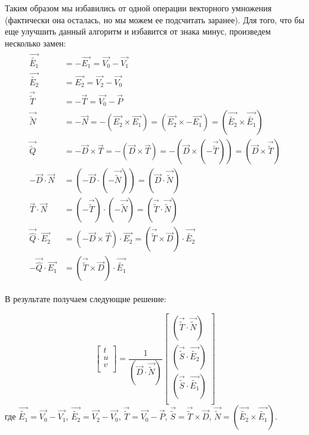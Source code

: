 \documentclass[12pt, a4paper]{article}
\begin{document}
Таким образом мы избавились от одной операции векторного умножения (фактически она осталась, но мы можем ее подсчитать заранее). 
Для того, что бы еще улучшить данный алгоритм и избавится от знака минус, произведем несколько замен:
\begin{eqnarray*}
\begin{split}
\vec{\tilde {E_1}} &= -\vec{E_1} = \vec{V_0} - \vec{V_1}\\
\vec{\tilde {E_2}} &= \vec{E_2} = \vec{V_2} - \vec{V_0}\\
\vec{\tilde {T}} &= -\vec{T} = \vec{V_0} - \vec{P}\\
\vec{\tilde {N}} &= -\vec{N} = - (\vec{E_2} \times \vec{E_1}) = (\vec{E_2} \times -\vec{E_1}) = (\vec{\tilde {E_2}} \times \vec{\tilde{E_1}}) \\
\vec{ \tilde{ Q } } &= - \vec{D} \times \vec{T} = - ( \vec{D} \times \vec{T}) = - ( \vec{D} \times ( - \vec{\tilde{T}})) = ( \vec{D} \times \vec{\tilde{T}} ) \\
-\vec{D} \cdot \vec{N} &= (-\vec{D} \cdot (-\vec{\tilde{N}})) = (\vec{D} \cdot \vec{\tilde{N}}) \\
\vec{T} \cdot \vec{N} &= (-\vec{\tilde{T}}) \cdot (-\vec{\tilde{N}}) = (\vec{\tilde{T}} \cdot \vec{\tilde{N}}) \\
\vec{\hat{Q}} \cdot \vec{E_2} &= (-\vec{D} \times \vec{T}) \cdot \vec{E_2} = (\vec{\tilde{T}} \times \vec{D}) \cdot \vec{\tilde{E_2}} \\
-\vec{\hat{Q}} \cdot \vec{E_1} &= (\vec{\tilde{T}} \times \vec{D}) \cdot \vec{\tilde{E_1}}
\end{split}
\end{eqnarray*}

В результате получаем следующие решение:

\begin{equation}
\label{ray_cross_tr_solv_fin}
\left[  
\begin{array}{c} t \\ u \\ v \\ \end{array}
\right] = 
\frac{1}{(\vec{D} \cdot \vec{\tilde{N}})} 
\left[  
	\begin{array}{c}
	(\vec{\tilde{T}} \cdot \vec{\tilde{N}}) \\
	(\vec{\tilde{S}} \cdot \vec{\tilde{E_2}}) \\	
	(\vec{\tilde{S}} \cdot \vec{\tilde{E_1}}) \\	
	\end{array}
\right]
\end{equation}
где 
$\vec{\tilde {E_1}} = \vec{V_0} - \vec{V_1}$,
$\vec{\tilde {E_2}} = \vec{V_2} - \vec{V_0}$,
$\vec{\tilde {T}}  = \vec{V_0} - \vec{P}$,
$\vec{\tilde{S}} = \vec{\tilde{T}} \times \vec{D}$,
$\vec{\tilde {N}} = (\vec{\tilde {E_2}} \times \vec{\tilde{E_1}})$.
\end{document}
